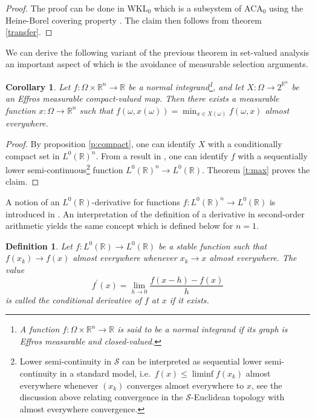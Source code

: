 \documentclass{jloganal}
\numberwithin{equation}{section}
\theoremstyle{plain}
\newtheorem{corollary}[subsection]{Corollary}
\newtheorem{definition}[subsection]{Definition}
\renewcommand{\leq}{\leqslant}
\renewcommand\R{\mathbb{R}}
\begin{document}
\begin{proof}
The proof can be done in WKL$_0$ which is a subsystem of ACA$_{0}$ using the Heine-Borel covering property \cite{simpson2009subsystems}. The claim then follows from theorem \ref{transfer}.
\end{proof}
We can derive the following variant of the previous theorem in set-valued analysis an important aspect of which is the avoidance of measurable selection arguments.   
\begin{corollary}
Let $f\colon \Omega\times \mathbb{R}^n\to \mathbb{R}$ be a normal integrand\footnote{A function $f\colon \Omega\times \mathbb{R}^n\to \mathbb{R}$ is said to be a normal integrand if its graph is Effros measurable and closed-valued.}, and let $X\colon \Omega\to 2^{\mathbb{R}^n}$ be an Effros measurable compact-valued map. 
Then there exists a measurable function $x\colon \Omega\to \mathbb{R}^n$ such that $f(\omega,x(\omega))=\min_{x\in X(\omega)} f(\omega, x)$ almost everywhere. 
\end{corollary}
\begin{proof}
By proposition \ref{p:compact}, one can identify $X$ with a conditionally compact set in $L^0(\mathbb{R})^n$. 
From a result in \cite[Section 5]{jamneshan2017parameter}, one can identify $f$ with a sequentially lower semi-continuous\footnote{Lower semi-continuity in $\mathcal{S}$ can be interpreted as sequential lower semi-continuity in a standard model, i.e.~$f(x)\leq \liminf f(x_k)$ almost everywhere whenever $(x_k)$ converges almost everywhere to $x$, see the discussion above relating convergence in the $\mathcal{S}$-Euclidean topology with almost everywhere convergence.} function $L^0(\mathbb{R})^n \to L^0(\mathbb{R})$.  
Theorem \ref{t:max} proves the claim. 
\end{proof}
A notion of an $L^0(\R)$-derivative for functions $f\colon L^0(\mathbb{R})^n\to L^0(\mathbb{R})$ is introduced in \cite[Section 7]{cheridito2015conditional}.  An interpretation of the definition of a derivative in second-order arithmetic yields the same concept which is defined below for $n=1$. 
\begin{definition}
Let $f\colon L^0(\mathbb{R})\to L^0(\mathbb{R})$ be a stable function such that $f(x_k)\to f(x)$ almost everywhere whenever $x_k\to x$ almost everywhere.  
The value 
\[
f^\prime(x)=\lim_{h\to 0}\frac{f(x-h)-f(x)}{h}
\]
is called the \emph{conditional derivative} of $f$ at $x$ if it exists.  
\end{definition}
\end{document}
